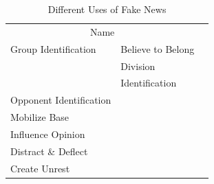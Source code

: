 \documentclass[10pt, a4paper, twocolumn]{article} %
\begin{document}
\begin{table}
	\caption{Different Uses of Fake News}
	\centering
	\begin{tabular}{llr}
		\toprule
		\multicolumn{2}{c}{Name} \\
		\cmidrule(r){1-2}
		Group Identification   & Believe to Belong &  \\
		                       & Division          &  \\
		                       & Identification    &  \\
                Opponent Identification & & \\
                Mobilize Base           & &  \\
		Influence Opinion       &  &  \\
		Distract \& Deflect     &   &  \\
		Create Unrest           &  &  \\
		\bottomrule
	\end{tabular}
\end{table}
\end{document}
